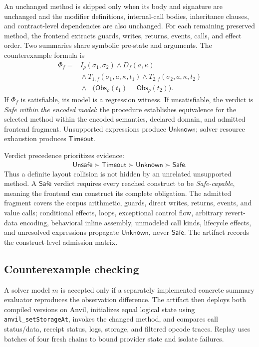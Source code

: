 \documentclass[runningheads]{llncs}
\newcommand{\obs}{\mathsf{Obs}}
\newcommand{\Safe}{\mathsf{Safe}}
\newcommand{\Unsafe}{\mathsf{Unsafe}}
\newcommand{\Unknown}{\mathsf{Unknown}}
\newcommand{\Timeout}{\mathsf{Timeout}}
\begin{document}
An unchanged method is skipped only when its body and signature are unchanged and the modifier definitions, internal-call bodies, inheritance clauses, and contract-level dependencies are also unchanged.  For each remaining preserved method, the frontend extracts guards, writes, returns, events, calls, and effect order.  Two summaries share symbolic pre-state and arguments.  The counterexample formula is
\begin{equation}
\begin{aligned}
\Phi_f={}&I_\rho(\sigma_1,\sigma_2)\land D_f(a,\kappa)\\
&{}\land T_{1,f}(\sigma_1,a,\kappa,t_1)
\land T_{2,f}(\sigma_2,a,\kappa,t_2)\\
&{}\land\neg\bigl(\obs_\rho(t_1)=\obs_\rho(t_2)\bigr).
\end{aligned}
\label{eq:product}
\end{equation}
If \(\Phi_f\) is satisfiable, its model is a regression witness.  If unsatisfiable, the verdict is \emph{Safe within the encoded model}: the procedure establishes equivalence for the selected method within the encoded semantics, declared domain, and admitted frontend fragment.  Unsupported expressions produce \(\Unknown\); solver resource exhaustion produces \(\Timeout\).

Verdict precedence prioritizes evidence:
\begin{equation}
\begin{aligned}
\Unsafe\succ\Timeout\succ\Unknown\succ\Safe.
\end{aligned}
\label{eq:verdict}
\end{equation}
Thus a definite layout collision is not hidden by an unrelated unsupported method.  A \(\Safe\) verdict requires every reached construct to be \emph{Safe-capable}, meaning the frontend can construct its complete obligation. The admitted fragment covers the corpus arithmetic, guards, direct writes, returns, events, and value calls; conditional effects, loops, exceptional control flow, arbitrary revert-data encoding, behavioral inline assembly, unmodeled call kinds, lifecycle effects, and unresolved expressions propagate \(\Unknown\), never \(\Safe\).  The artifact records the construct-level admission matrix.

\subsection{Counterexample checking}

A solver model \(m\) is accepted only if a separately implemented concrete summary evaluator reproduces the observation difference.  The artifact then deploys both compiled versions on Anvil, initializes equal logical state using \texttt{anvil\_setStorageAt}, invokes the changed method, and compares call status/data, receipt status, logs, storage, and filtered opcode traces.  Replay uses batches of four fresh chains to bound provider state and isolate failures.
\end{document}
